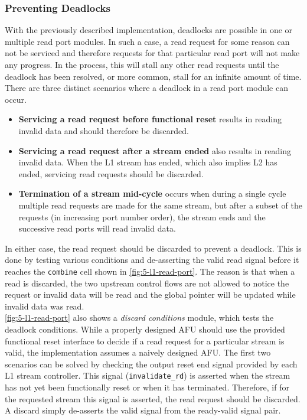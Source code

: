 \subsubsection{Preventing Deadlocks}
\label{sec:deadlocks}
With the previously described implementation, deadlocks are possible in one or multiple read port modules. In such a case, a read request for some reason can not be serviced and therefore requests for that particular read port will not make any progress. In the process, this will stall any other read requests until the deadlock has been resolved, or more common, stall for an infinite amount of time. There are three distinct scenarios where a deadlock in a read port module can occur.
\begin{itemize}
  \item{\textbf{Servicing a read request before functional reset} results in reading invalid data and should therefore be discarded.}
  \item{\textbf{Servicing a read request after a stream ended} also results in reading invalid data. When the L1 stream has ended, which also implies L2 has ended, servicing read requests should be discarded.}
  \item{\textbf{Termination of a stream mid-cycle} occurs when during a single cycle multiple read requests are made for the same stream, but after a subset of the requests (in increasing port number order), the stream ends and the successive read ports will read invalid data.}
\end{itemize}
In either case, the read request should be discarded to prevent a deadlock. This is done by testing various conditions and de-asserting the valid read signal before it reaches the \texttt{combine} cell shown in \autoref{fig:5-l1-read-port}. The reason is that when a read is discarded, the two upstream control flows are not allowed to notice the request or invalid data will be read and the global pointer will be updated while invalid data was read.\\
\autoref{fig:5-l1-read-port} also shows a \textit{discard conditions} module, which tests the deadlock conditions. While a properly designed AFU should use the provided functional reset interface to decide if a read request for a particular stream is valid, the implementation assumes a naively designed AFU. The first two scenarios can be solved by checking the output reset end signal provided by each L1 stream controller. This signal (\texttt{invalidate\_rd}) is asserted when the stream has not yet been functionally reset or when it has terminated. Therefore, if for the requested stream this signal is asserted, the read request should be discarded. A discard simply de-asserts the valid signal from the ready-valid signal pair.\\
